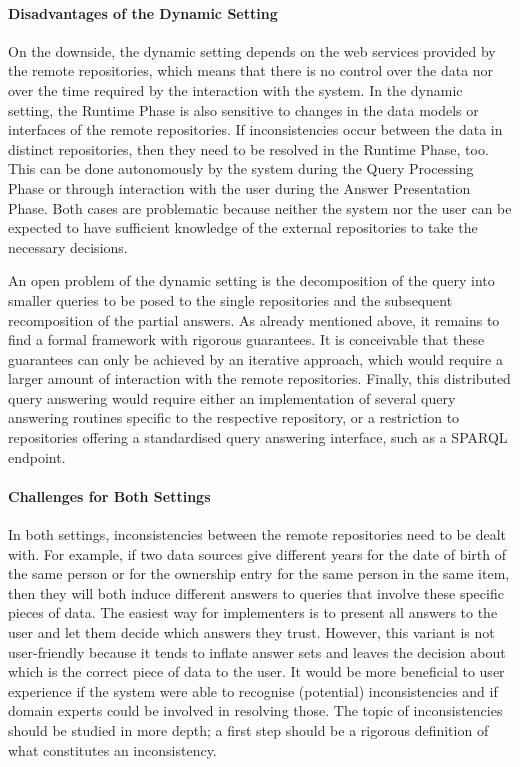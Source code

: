\paragraph{Disadvantages of the Dynamic Setting}

On the downside, the dynamic setting depends on the web services provided by the remote repositories,
which means that there is no control over the data nor over the time required
by the interaction with the system.
In the dynamic setting, the Runtime Phase is also sensitive to changes in the data models
or interfaces of the remote repositories.
If inconsistencies occur between the data in distinct repositories,
then they need to be resolved in the Runtime Phase, too.
This can be done autonomously by the system during the Query Processing Phase
or through interaction with the user during the Answer Presentation Phase.
Both cases are problematic because neither the system nor the user
can be expected to have sufficient knowledge of the external repositories
to take the necessary decisions.

An open problem of the dynamic setting is the decomposition of the query
into smaller queries to be posed to the single repositories
and the subsequent recomposition of the partial answers.
As already mentioned above, it remains to find a
formal framework with rigorous guarantees.
It is conceivable that these guarantees can only be achieved by an iterative approach,
which would require a larger amount of interaction with the remote repositories.
Finally, this distributed query answering would require either an implementation
of several query answering routines specific to the respective repository,
or a restriction to repositories offering a standardised query answering interface,
such as a \gls{SPARQL} endpoint.

\paragraph{Challenges for Both Settings}

In both settings, inconsistencies between the remote repositories need to be dealt with.
For example, if two data sources give different years for the date of birth of the same person
or for the ownership entry for the same person in the same item,
then they will both induce different answers to queries that involve these specific
pieces of data.
The easiest way for implementers is to present all answers to the user
and let them decide which answers they trust.
However, this variant is not user-friendly because it tends to inflate answer sets
and leaves the decision about which is the correct piece of data to the user.
It would be more beneficial to user experience 
if the system were able to recognise (potential) inconsistencies
and if domain experts could be involved in resolving those.
The topic of inconsistencies should be studied in more depth;
a first step should be a rigorous definition of what constitutes an inconsistency.

